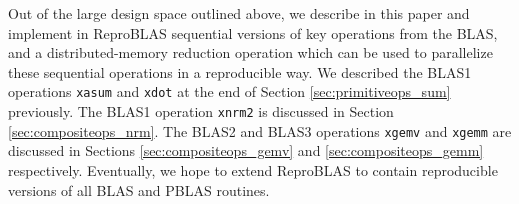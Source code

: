   Out of the large design space outlined above, we describe in this paper and implement in ReproBLAS sequential versions of key operations from the BLAS, and a distributed-memory reduction operation which can be used to parallelize these sequential operations in a reproducible way. We described the BLAS1 operations \texttt{xasum} and \texttt{xdot} at the end of Section \ref{sec:primitiveops_sum} previously. The BLAS1 operation \texttt{xnrm2} is discussed in Section \ref{sec:compositeops_nrm}. The BLAS2 and BLAS3 operations \texttt{xgemv} and \texttt{xgemm} are discussed in Sections \ref{sec:compositeops_gemv} and \ref{sec:compositeops_gemm} respectively. Eventually, we hope to extend ReproBLAS to contain reproducible versions of all BLAS and PBLAS routines.

    
    
    
    

